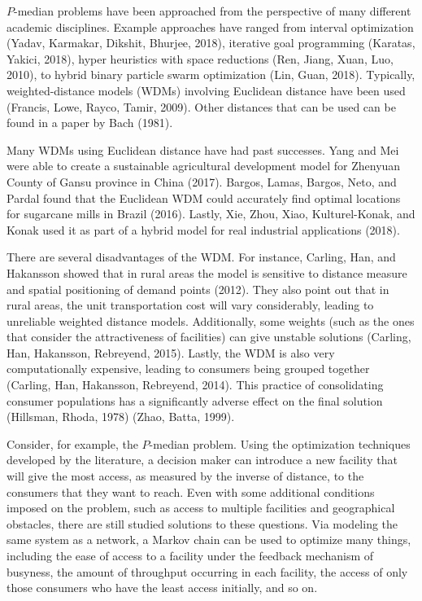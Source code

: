 \documentclass[twoside,twocolumn]{article}
\begin{document}
$P$-median problems have been approached from the perspective of many different academic disciplines.
Example approaches have ranged from interval optimization (Yadav, Karmakar, Dikshit, Bhurjee, 2018), iterative goal programming (Karatas, Yakici, 2018), hyper heuristics with space reductions (Ren, Jiang, Xuan, Luo, 2010), to hybrid binary particle swarm optimization (Lin, Guan, 2018).
Typically, weighted-distance models (WDMs) involving Euclidean distance have been used (Francis, Lowe, Rayco, Tamir, 2009).
Other distances that can be used can be found in a paper by Bach (1981).

Many WDMs using Euclidean distance have had past successes.
Yang and Mei were able to create a sustainable agricultural development model for Zhenyuan County of Gansu province in China (2017).
Bargos, Lamas, Bargos, Neto, and Pardal found that the Euclidean WDM could accurately find optimal locations for sugarcane mills in Brazil (2016).
Lastly, Xie, Zhou, Xiao, Kulturel-Konak, and Konak used it as part of a hybrid model for real industrial applications (2018).

There are several disadvantages of the WDM.
For instance, Carling, Han, and Hakansson showed that in rural areas the model is sensitive to distance measure and spatial positioning of demand points (2012).
They also point out that in rural areas, the unit transportation cost will vary considerably, leading to unreliable weighted distance models.
Additionally, some weights (such as the ones that consider the attractiveness of facilities) can give unstable solutions (Carling, Han, Hakansson, Rebreyend, 2015).
Lastly, the WDM is also very computationally expensive, leading to consumers being grouped together (Carling, Han, Hakansson, Rebreyend, 2014). 
This practice of consolidating consumer populations has a significantly adverse effect on the final solution (Hillsman, Rhoda, 1978) (Zhao, Batta, 1999).



Consider, for example, the $P$-median problem.
Using the optimization techniques developed by the literature, a decision maker can introduce a new facility that will give the most access, as measured by the inverse of distance, to the consumers that they want to reach. %
Even with some additional conditions imposed on the problem, such as access to multiple facilities and geographical obstacles, there are still studied solutions to these questions.%
Via modeling the same system as a network, a Markov chain can be used to optimize many things, including the ease of access to a facility under the feedback mechanism of busyness, the amount of throughput occurring in each facility, the access of only those consumers who have the least access initially, and so on. %
\end{document}
